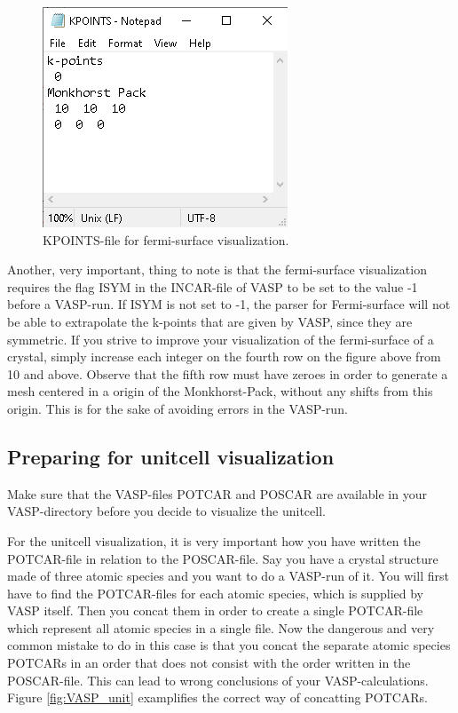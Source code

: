 \begin{figure}[H]
    \centering
    \includegraphics[scale = 0.55]{images/usermanual_fermisurface.png}
    \caption{KPOINTS-file for fermi-surface visualization.}
    \label{fig:VASP_fermisurface}
\end{figure}

Another, very important, thing to note is that the fermi-surface visualization requires the flag ISYM in the INCAR-file of VASP to be set to the value -1 before a VASP-run. If ISYM is not set to -1, the parser for Fermi-surface will not be able to extrapolate the k-points that are given by VASP, since they are symmetric. If you strive to improve your visualization of the fermi-surface of a crystal, simply increase each integer on the fourth row on the figure above from 10 and above. Observe that the fifth row must have zeroes in order to generate a mesh centered in a origin of the Monkhorst-Pack, without any shifts from this origin. This is for the sake of avoiding errors in the VASP-run.

\subsection{Preparing for unitcell visualization}
\label{section_unit}

Make sure that the VASP-files POTCAR and POSCAR are available in your VASP-directory before you decide to visualize the unitcell. 

For the unitcell visualization, it is very important how you have written the POTCAR-file in relation to the POSCAR-file. Say you have a crystal structure made of three atomic species and you want to do a VASP-run of it. You will first have to find the POTCAR-files for each atomic species, which is supplied by VASP itself. Then you concat them in order to create a single POTCAR-file which represent all atomic species in a single file. Now the dangerous and very common mistake to do in this case is that you concat the separate atomic species POTCARs in an order that does not consist with the order written in the POSCAR-file. This can lead to wrong conclusions of your VASP-calculations. Figure \ref{fig:VASP_unit} examplifies the correct way of concatting POTCARs.

